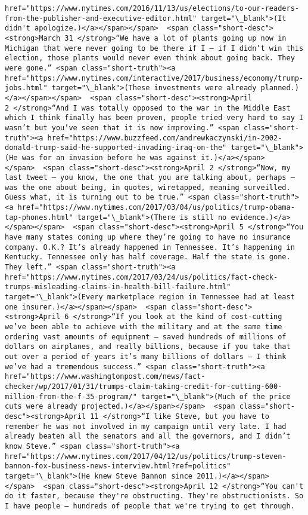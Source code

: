 \documentclass[11pt]{article}
\begin{document}
\begin{Verbatim}[commandchars=\\\{\}]
href="https://www.nytimes.com/2016/11/13/us/elections/to-our-readers-from-the-publisher-and-executive-editor.html" target="\_blank">(It didn't apologize.)</a></span></span>  <span class="short-desc"><strong>March 31 </strong>“We have a lot of plants going up now in Michigan that were never going to be there if I — if I didn’t win this election, those plants would never even think about going back. They were gone.” <span class="short-truth"><a href="https://www.nytimes.com/interactive/2017/business/economy/trump-jobs.html" target="\_blank">(These investments were already planned.)</a></span></span>  <span class="short-desc"><strong>April 2 </strong>“And I was totally opposed to the war in the Middle East which I think finally has been proven, people tried very hard to say I wasn’t but you’ve seen that it is now improving.” <span class="short-truth"><a href="https://www.buzzfeed.com/andrewkaczynski/in-2002-donald-trump-said-he-supported-invading-iraq-on-the" target="\_blank">(He was for an invasion before he was against it.)</a></span></span>  <span class="short-desc"><strong>April 2 </strong>“Now, my last tweet — you know, the one that you are talking about, perhaps — was the one about being, in quotes, wiretapped, meaning surveilled. Guess what, it is turning out to be true.” <span class="short-truth"><a href="https://www.nytimes.com/2017/03/04/us/politics/trump-obama-tap-phones.html" target="\_blank">(There is still no evidence.)</a></span></span>  <span class="short-desc"><strong>April 5 </strong>“You have many states coming up where they’re going to have no insurance company. O.K.? It’s already happened in Tennessee. It’s happening in Kentucky. Tennessee only has half coverage. Half the state is gone. They left.” <span class="short-truth"><a href="https://www.nytimes.com/2017/03/24/us/politics/fact-check-trumps-misleading-claims-in-health-bill-failure.html" target="\_blank">(Every marketplace region in Tennessee had at least one insurer.)</a></span></span>  <span class="short-desc"><strong>April 6 </strong>“If you look at the kind of cost-cutting we’ve been able to achieve with the military and at the same time ordering vast amounts of equipment — saved hundreds of millions of dollars on airplanes, and really billions, because if you take that out over a period of years it’s many billions of dollars — I think we’ve had a tremendous success.” <span class="short-truth"><a href="https://www.washingtonpost.com/news/fact-checker/wp/2017/01/31/trumps-claim-taking-credit-for-cutting-600-million-from-the-f-35-program/" target="\_blank">(Much of the price cuts were already projected.)</a></span></span>  <span class="short-desc"><strong>April 11 </strong>“I like Steve, but you have to remember he was not involved in my campaign until very late. I had already beaten all the senators and all the governors, and I didn’t know Steve.” <span class="short-truth"><a href="https://www.nytimes.com/2017/04/12/us/politics/trump-steven-bannon-fox-business-news-interview.html?ref=politics" target="\_blank">(He knew Steve Bannon since 2011.)</a></span></span>  <span class="short-desc"><strong>April 12 </strong>“You can't do it faster, because they're obstructing. They're obstructionists. So I have people — hundreds of people that we're trying to get through. 
\end{Verbatim}
\end{document}
